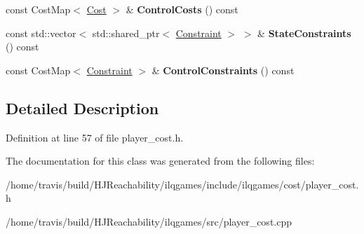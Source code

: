 \begin{DoxyCompactItemize}
\item 
const Cost\+Map$<$ \hyperlink{classilqgames_1_1_cost}{Cost} $>$ \& {\bfseries Control\+Costs} () const \hypertarget{classilqgames_1_1_player_cost_a4fa0717c227acf2773deda56eaf62e99}{}\label{classilqgames_1_1_player_cost_a4fa0717c227acf2773deda56eaf62e99}

\item 
const std\+::vector$<$ std\+::shared\+\_\+ptr$<$ \hyperlink{classilqgames_1_1_constraint}{Constraint} $>$ $>$ \& {\bfseries State\+Constraints} () const \hypertarget{classilqgames_1_1_player_cost_ac6ef894e71fd9524bd6aa6d3982f415a}{}\label{classilqgames_1_1_player_cost_ac6ef894e71fd9524bd6aa6d3982f415a}

\item 
const Cost\+Map$<$ \hyperlink{classilqgames_1_1_constraint}{Constraint} $>$ \& {\bfseries Control\+Constraints} () const \hypertarget{classilqgames_1_1_player_cost_acf0081bb561f71522cd9716a9e34eb60}{}\label{classilqgames_1_1_player_cost_acf0081bb561f71522cd9716a9e34eb60}

\end{DoxyCompactItemize}


\subsection{Detailed Description}


Definition at line 57 of file player\+\_\+cost.\+h.



The documentation for this class was generated from the following files\+:\begin{DoxyCompactItemize}
\item 
/home/travis/build/\+H\+J\+Reachability/ilqgames/include/ilqgames/cost/player\+\_\+cost.\+h\item 
/home/travis/build/\+H\+J\+Reachability/ilqgames/src/player\+\_\+cost.\+cpp\end{DoxyCompactItemize}
